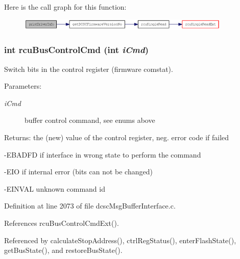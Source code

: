 Here is the call graph for this function:\begin{figure}[H]
\begin{center}
\leavevmode
\includegraphics[width=287pt]{group__dcsc__msg__buffer__access_g919bc832f5a0e82c07cfafd699b1b2ea_cgraph}
\end{center}
\end{figure}
\hypertarget{group__dcsc__msg__buffer__access_gf74b29f8ded2feb57974c95e4863eac8}{
\subsubsection[rcuBusControlCmd]{\setlength{\rightskip}{0pt plus 5cm}int rcu\-Bus\-Control\-Cmd (int {\em i\-Cmd})}}
\label{group__dcsc__msg__buffer__access_gf74b29f8ded2feb57974c95e4863eac8}


Switch bits in the control register (firmware comstat). 

\begin{Desc}
\item[Parameters:]
\begin{description}
\item[{\em i\-Cmd}]buffer control command, see enums above \end{description}
\end{Desc}
\begin{Desc}
\item[Returns:]the (new) value of the control register, neg. error code if failed\par
 -EBADFD if interface in wrong state to perform the command\par
 -EIO if internal error (bits can not be changed)\par
 -EINVAL unknown command id \end{Desc}


Definition at line 2073 of file dcsc\-Msg\-Buffer\-Interface.c.

References rcu\-Bus\-Control\-Cmd\-Ext().

Referenced by calculate\-Stop\-Address(), ctrl\-Reg\-Status(), enter\-Flash\-State(), get\-Bus\-State(), and restore\-Bus\-State().

